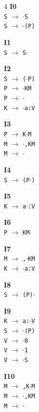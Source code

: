 \documentclass[11pt]{article}
\begin{document}
\begin{multicols}{4}\small
\noindent\textbf{I0}\\\texttt{S\textquotesingle} $\to$ \texttt{$\cdot$S}\\\texttt{S} $\to$ \texttt{$\cdot$(P)}

\smallskip
\noindent\textbf{I1}\\\texttt{S\textquotesingle} $\to$ \texttt{S$\cdot$}

\smallskip
\noindent\textbf{I2}\\\texttt{S} $\to$ \texttt{($\cdot$P)}\\\texttt{P} $\to$ \texttt{$\cdot$KM}\\\texttt{P} $\to$ \texttt{$\cdot$}\\\texttt{K} $\to$ \texttt{$\cdot$a:V}

\smallskip
\noindent\textbf{I3}\\\texttt{P} $\to$ \texttt{K$\cdot$M}\\\texttt{M} $\to$ \texttt{$\cdot$,{}KM}\\\texttt{M} $\to$ \texttt{$\cdot$}

\smallskip
\noindent\textbf{I4}\\\texttt{S} $\to$ \texttt{(P$\cdot$)}

\smallskip
\noindent\textbf{I5}\\\texttt{K} $\to$ \texttt{a$\cdot$:V}

\smallskip
\noindent\textbf{I6}\\\texttt{P} $\to$ \texttt{KM$\cdot$}

\smallskip
\noindent\textbf{I7}\\\texttt{M} $\to$ \texttt{,{}$\cdot$KM}\\\texttt{K} $\to$ \texttt{$\cdot$a:V}

\smallskip
\noindent\textbf{I8}\\\texttt{S} $\to$ \texttt{(P)$\cdot$}

\smallskip
\noindent\textbf{I9}\\\texttt{K} $\to$ \texttt{a:$\cdot$V}\\\texttt{S} $\to$ \texttt{$\cdot$(P)}\\\texttt{V} $\to$ \texttt{$\cdot$0}\\\texttt{V} $\to$ \texttt{$\cdot$1}\\\texttt{V} $\to$ \texttt{$\cdot$S}

\smallskip
\noindent\textbf{I10}\\\texttt{M} $\to$ \texttt{,{}K$\cdot$M}\\\texttt{M} $\to$ \texttt{$\cdot$,{}KM}\\\texttt{M} $\to$ \texttt{$\cdot$}


\end{multicols}
\end{document}

